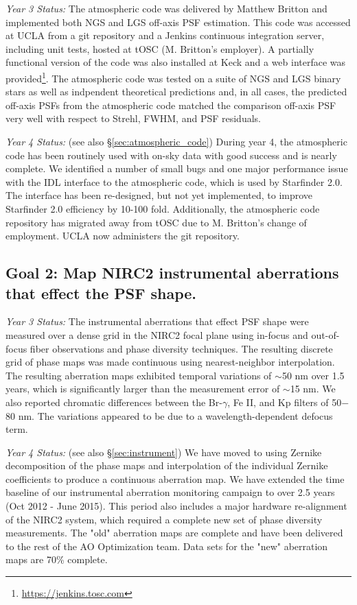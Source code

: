 \noindent
\textit{Year 3 Status:}
The atmospheric code was delivered by Matthew Britton and
implemented both NGS and LGS off-axis PSF estimation. This code was
accessed at UCLA from a git repository and a Jenkins continuous
integration server, including unit tests, hosted at tOSC
(M. Britton's employer). A partially functional version of the code
was also installed at Keck and a web interface was 
provided\footnote{\url{https://jenkins.tosc.com}}.
The atmospheric code was tested on a suite of NGS and LGS
binary stars as well as indpendent theoretical predictions and, in
all cases, the predicted off-axis PSFs from the atmospheric code
matched the comparison off-axis PSF very well with respect to
Strehl, FWHM, and PSF residuals. 

\noindent
\textit{Year 4 Status:} (see also \S\ref{sec:atmospheric_code})
During year 4, the atmospheric code has been routinely used with on-sky data with good success and is nearly complete.
We identified a number of small bugs and one major
performance issue with the IDL interface to the atmospheric code, 
which is used by Starfinder 2.0. The interface has been re-designed, but not yet
implemented, to improve Starfinder 2.0 efficiency by 10-100
fold. Additionally, the atmospheric code repository has migrated away
from tOSC due to M. Britton's change of employment. 
UCLA now administers the git repository.



\subsection{Goal 2:  Map NIRC2 instrumental aberrations that effect the PSF
    shape.}

\noindent 
\textit{Year 3 Status:}
The instrumental aberrations that effect PSF shape were measured over
a dense grid in the NIRC2 focal plane using in-focus and out-of-focus
fiber observations and phase diversity techniques. The resulting
discrete grid of phase maps was made continuous using nearest-neighbor
interpolation. The resulting aberration maps exhibited temporal
variations of $\sim$50 nm over 1.5 years, which is significantly
larger than the measurement error of $\sim$15 nm. We also reported 
chromatic differences between the Br-$\gamma$, Fe \textrm{II}, and Kp
filters of 50$-$80 nm. The variations appeared to be due to a
wavelength-dependent defocus term.
  
\noindent 
\textit{Year 4 Status:} (see also \S\ref{sec:instrument})
We have moved to using Zernike decomposition of the phase maps and 
interpolation of the individual
Zernike coefficients to produce a continuous aberration map. 
We have extended the time baseline of our instrumental aberration
monitoring campaign to over 2.5 years (Oct 2012 - June 2015). This
period also includes a major hardware re-alignment of the NIRC2
system, which required a complete new set of phase diversity
measurements. The "old" aberration maps are complete and have been 
delivered to the rest of the AO Optimization team. Data sets for 
the "new" aberration maps are 70\% complete.

